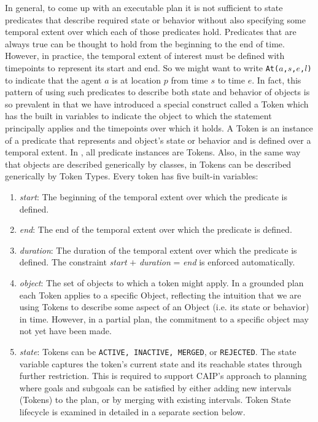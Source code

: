 \begin{description}
  In general, to come up with an executable plan it is not sufficient
  to state predicates that describe required state or behavior without
  also specifying some temporal extent over which each of those
  predicates hold. Predicates that are always true can be thought to
  hold from the beginning to the end of time. However, in practice,
  the temporal extent of interest must be defined with timepoints to
  represent its start and end. So we might want to write
  \texttt{At($a$,$s$,$e$,$l$)} to indicate that the agent $a$ is at
  location $p$ from time $s$ to time $e$. In fact, this pattern of
  using such predicates to describe both state and behavior of objects
  is so prevalent in \eu that we have introduced a special construct
  called a Token which has the built in variables to indicate the
  object to which the statement principally applies and the timepoints
  over which it holds. A Token is an instance of a predicate that
  represents and object's state or behavior and is defined over a
  temporal extent. In \eu, all predicate instances are Tokens. Also,
  in the same way that objects are described generically by classes,
  in \eu Tokens can be described generically by Token Types. Every
  token has five built-in variables:

  \begin{enumerate}

  \item \textit {start}: The beginning of the temporal extent over
    which the predicate is defined.

  \item \textit {end}: The end of the temporal extent over which the
    predicate is defined.

  \item \textit {duration}: The duration of the temporal extent over which the predicate is defined. The constraint \textit{start} $+$
    \textit{duration} = \textit{end} is enforced automatically.

  \item \textit{object}: The set of objects to which a token might
    apply. In a grounded plan each Token applies to a specific Object,
    reflecting the intuition that we are using Tokens to describe some
    aspect of an Object (i.e. its state or behavior) in time. However,
    in a partial plan, the commitment to a specific object may not yet
    have been made.

  \item \textit{state}: Tokens can be \texttt{ACTIVE, INACTIVE,
      MERGED}, or \texttt{REJECTED}. The state variable captures the
    token's current state and its reachable states through further
    restriction.  This is required to support CAIP's approach to planning where goals and subgoals can be satisfied by either adding new intervals (Tokens) to the plan, or by merging with existing intervals. Token State lifecycle is examined in detailed in a separate section below.


\end{enumerate}
\end{description}
